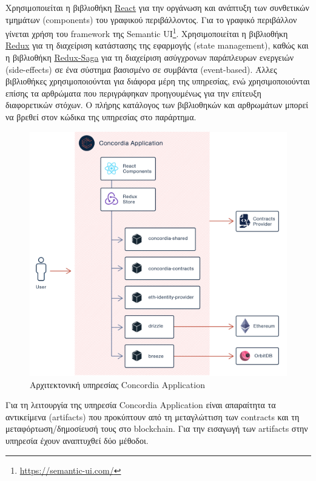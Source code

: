 Χρησιμοποιείται η βιβλιοθήκη \hyperref[subsection:4-2-2-1-react]{React} για την οργάνωση και ανάπτυξη των συνθετικών τμημάτων (components) του γραφικού περιβάλλοντος. Για το γραφικό περιβάλλον γίνεται χρήση του framework της Semantic UI\footnote{\url{https://semantic-ui.com/}}. Χρησιμοποιείται η βιβλιοθήκη \hyperref[subsection:4-2-2-2-redux]{Redux} για τη διαχείριση κατάστασης της εφαρμογής (state management),
καθώς και η βιβλιοθήκη \hyperref[subsection:4-2-2-3-redux-saga]{Redux-Saga} για τη διαχείριση ασύγχρονων παράπλευρων ενεργειών (side-effects) σε ένα σύστημα βασισμένο σε συμβάντα (event-based). Άλλες βιβλιοθήκες χρησιμοποιούνται για διάφορα μέρη της υπηρεσίας, ενώ χρησιμοποιούνται επίσης τα αρθρώματα που περιγράφηκαν προηγουμένως για την επίτευξη διαφορετικών στόχων. Ο πλήρης κατάλογος των βιβλιοθηκών και αρθρωμάτων μπορεί να βρεθεί στον κώδικα της υπηρεσίας στο παράρτημα. %

\begin{figure}[H]
    \centering
    \includegraphics[width=.9\textwidth]{assets/figures/chapter-4/4.3.architecture-4.3.2.concordia-application-architecture.png}
    \caption{Αρχιτεκτονική υπηρεσίας Concordia Application}
    \label{figure:4-3-concordia-application-architecture}
\end{figure}

Για τη λειτουργία της υπηρεσία Concordia Application είναι απαραίτητα τα αντικείμενα (artifacts) που προκύπτουν από τη μεταγλώττιση των contracts και τη μεταφόρτωση/δημοσίευσή τους στο blockchain. Για την εισαγωγή των artifacts στην υπηρεσία έχουν αναπτυχθεί δύο μέθοδοι.

